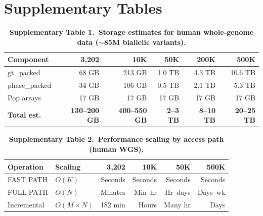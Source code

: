 \documentclass[11pt,a4paper]{article}
\begin{document}
\clearpage

\section{Supplementary Tables}

\begin{table}[p]
\centering
\caption*{\textbf{Supplementary Table 1.~Storage estimates for human whole-genome data ($\sim$85M biallelic variants).}}
\vspace{0.5em}
\begin{tabular}{@{}lrrrrr@{}}
\toprule
Component & 3,202 & 10K & 50K & 200K & 500K \\
\midrule
gt\_packed & 68 GB & 213 GB & 1.0 TB & 4.3 TB & 10.6 TB \\
phase\_packed & 34 GB & 106 GB & 0.5 TB & 2.1 TB & 5.3 TB \\
Pop arrays & 17 GB & 17 GB & 17 GB & 17 GB & 17 GB \\
\textbf{Total est.} & \textbf{130--200 GB} & \textbf{400--550 GB} & \textbf{2--3 TB} & \textbf{8--10 TB} & \textbf{20--25 TB} \\
\bottomrule
\end{tabular}
\end{table}

\clearpage

\begin{table}[p]
\centering
\caption*{\textbf{Supplementary Table 2.~Performance scaling by access path (human WGS).}}
\vspace{0.5em}
\begin{tabular}{@{}llrrrr@{}}
\toprule
Operation & Scaling & 3,202 & 10K & 50K & 500K \\
\midrule
FAST PATH & $O(K)$ & Seconds & Seconds & Seconds & Seconds \\
FULL PATH & $O(N)$ & Minutes & Min--hr & Hr--days & Days--wk \\
Incremental & $O(M \times N)$ & 182 min & Hours & Many hr & Days \\
\bottomrule
\end{tabular}
\end{table}

\clearpage
\end{document}
